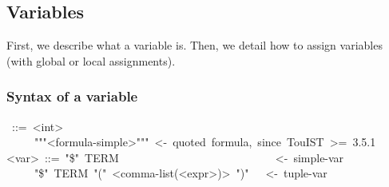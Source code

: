 \subsection{Variables}\label{sec-variables}%

\noindent First, we describe what a variable is. Then, we detail how to assign
variables (with global or local assignments).%

\subsubsection{Syntax of a variable}\label{sec-syntax-of-a-variable}%
\begin{mdpre}%
~::=~{\textless{}int\textgreater{}}\\
~~~~\textbar{}~"""{\textless{}formula-simple\textgreater{}}"""~{\textless{}-~quoted~formula,~since~TouIST~\textgreater{}=~3.5.1}\\
{\textless{}var\textgreater{}}~::=~"\$"~TERM~~~~~~~~~~~~~~~~~~~~~~~~~~~~{\textless{}-~simple-var}\\
~~~~\textbar{}~"\$"~TERM~"("~{\textless{}comma-list(\textless{}expr\textgreater{})\textgreater{}}~")"~~~{\textless{}-~tuple-var}%
\end{mdpre}
